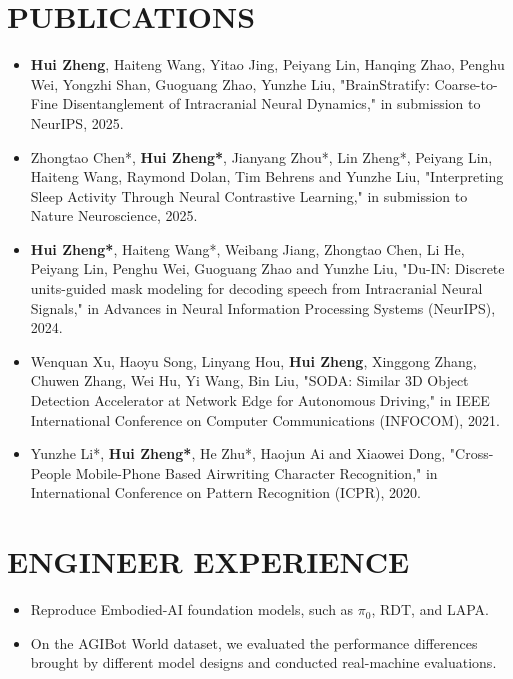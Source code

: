 \documentclass{resume}
\begin{document}
\section{{\bfseries PUBLICATIONS}}
\begin{itemize}[parsep=0.2ex]
  \item \textbf{Hui Zheng}, Haiteng Wang, Yitao Jing, Peiyang Lin, Hanqing Zhao, Penghu Wei, Yongzhi Shan, Guoguang Zhao, Yunzhe Liu, "BrainStratify: Coarse-to-Fine Disentanglement of Intracranial Neural Dynamics," in submission to NeurIPS, 2025.
  \item Zhongtao Chen*, \textbf{Hui Zheng*}, Jianyang Zhou*, Lin Zheng*, Peiyang Lin, Haiteng Wang, Raymond Dolan, Tim Behrens and Yunzhe Liu, "Interpreting Sleep Activity Through Neural Contrastive Learning," in submission to Nature Neuroscience, 2025.
  \item \textbf{Hui Zheng*}, Haiteng Wang*, Weibang Jiang, Zhongtao Chen, Li He, Peiyang Lin, Penghu Wei, Guoguang Zhao and Yunzhe Liu, "Du-IN: Discrete units-guided mask modeling for decoding speech from Intracranial Neural Signals," in Advances in Neural Information Processing Systems (NeurIPS), 2024.
  \item Wenquan Xu, Haoyu Song, Linyang Hou, \textbf{Hui Zheng}, Xinggong Zhang, Chuwen Zhang, Wei Hu, Yi Wang, Bin Liu, "SODA: Similar 3D Object Detection Accelerator at Network Edge for Autonomous Driving," in IEEE International Conference on Computer Communications (INFOCOM), 2021.
  \item Yunzhe Li*, \textbf{Hui Zheng*}, He Zhu*, Haojun Ai and Xiaowei Dong, "Cross-People Mobile-Phone Based Airwriting Character Recognition," in International Conference on Pattern Recognition (ICPR), 2020.
\end{itemize}

\section{{\bfseries ENGINEER EXPERIENCE}}
\begin{itemize}[parsep=0.2ex]
  \item Reproduce Embodied-AI foundation models, such as $\pi_{0}$, RDT, and LAPA.
  \item On the AGIBot World dataset, we evaluated the performance differences brought by different model designs and conducted real-machine evaluations.
\end{itemize}
\end{document}
